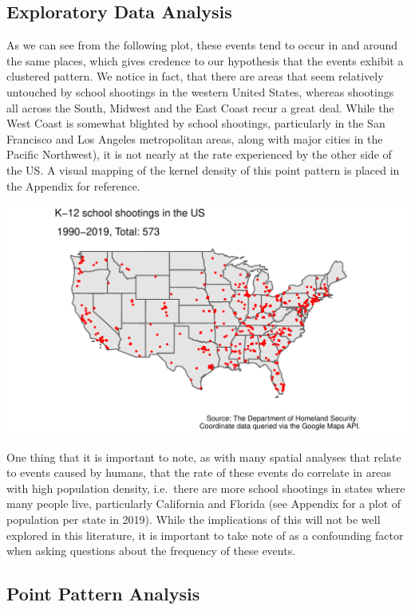 \documentclass[
  12pt,
]{article}
\begin{document}
\hypertarget{exploratory-data-analysis}{%
\subsection{Exploratory Data Analysis}\label{exploratory-data-analysis}}

As we can see from the following plot, these events tend to occur in and
around the same places, which gives credence to our hypothesis that the
events exhibit a clustered pattern. We notice in fact, that there are
areas that seem relatively untouched by school shootings in the western
United States, whereas shootings all across the South, Midwest and the
East Coast recur a great deal. While the West Coast is somewhat blighted
by school shootings, particularly in the San Francisco and Los Angeles
metropolitan areas, along with major cities in the Pacific Northwest),
it is not nearly at the rate experienced by the other side of the US. A
visual mapping of the kernel density of this point pattern is placed in
the Appendix for reference.

\includegraphics{JStevenRaquel_STATS295_Final_files/figure-latex/plot-point-pattern-9019-1.pdf}

One thing that it is important to note, as with many spatial analyses
that relate to events caused by humans, that the rate of these events do
correlate in areas with high population density, i.e.~there are more
school shootings in states where many people live, particularly
California and Florida (see Appendix for a plot of population per state
in 2019). While the implications of this will not be well explored in
this literature, it is important to take note of as a confounding factor
when asking questions about the frequency of these events.

\hypertarget{point-pattern-analysis}{%
\subsection{Point Pattern Analysis}\label{point-pattern-analysis}}
\end{document}
